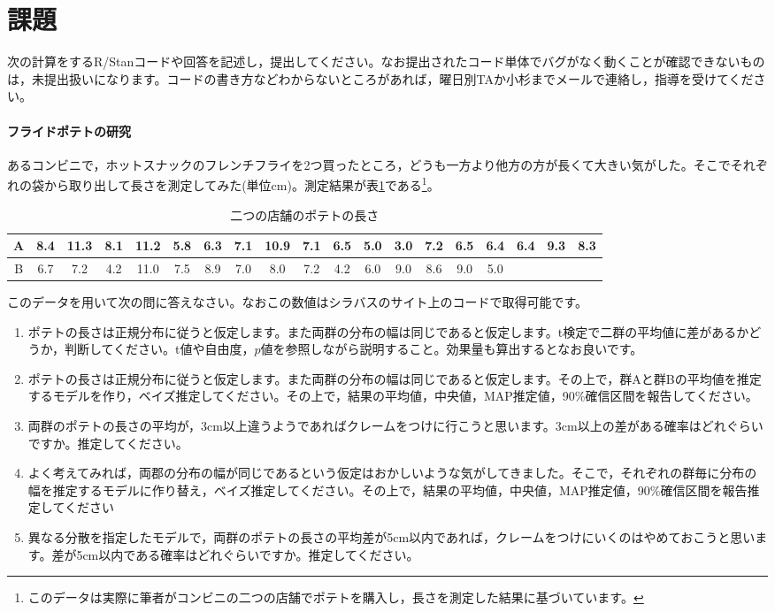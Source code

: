 \documentclass{ltjsbook}
\begin{document}
\section{課題}
次の計算をするR/Stanコードや回答を記述し，提出してください。なお提出されたコード単体でバグがなく動くことが確認できないものは，未提出扱いになります。コードの書き方などわからないところがあれば，曜日別TAか小杉までメールで連絡し，指導を受けてください。

\paragraph{フライドポテトの研究}
あるコンビニで，ホットスナックのフレンチフライを2つ買ったところ，どうも一方より他方の方が長くて大きい気がした。そこでそれぞれの袋から取り出して長さを測定してみた(単位cm)。測定結果が表\ref{tab:19_01}である\footnote{このデータは実際に筆者がコンビニの二つの店舗でポテトを購入し，長さを測定した結果に基づいています。}。
\begin{table}[ht]
	\center
	\caption{二つの店舗のポテトの長さ}
	\begin{tabular}{c|cccccccccccccccccc}\hline
		A & 8.4 & 11.3 & 8.1 & 11.2 & 5.8 & 6.3 & 7.1 & 10.9 & 7.1 & 6.5 & 5.0 & 3.0 & 7.2 & 6.5 & 6.4 & 6.4 & 9.3 & 8.3 \\\hline
		B & 6.7 & 7.2  & 4.2 & 11.0 & 7.5 & 8.9 & 7.0 & 8.0  & 7.2 & 4.2 & 6.0 & 9.0 & 8.6 & 9.0 & 5.0 &     &     &     \\\hline
	\end{tabular}
	\label{tab:19_01}
\end{table}
このデータを用いて次の問に答えなさい。なおこの数値はシラバスのサイト上のコードで取得可能です。
\begin{enumerate}
	\item ポテトの長さは正規分布に従うと仮定します。また両群の分布の幅は同じであると仮定します。t検定で二群の平均値に差があるかどうか，判断してください。t値や自由度，$p$値を参照しながら説明すること。効果量も算出するとなお良いです。
	\item ポテトの長さは正規分布に従うと仮定します。また両群の分布の幅は同じであると仮定します。その上で，群Aと群Bの平均値を推定するモデルを作り，ベイズ推定してください。その上で，結果の平均値，中央値，MAP推定値，90\%確信区間を報告してください。
	\item 両群のポテトの長さの平均が，3cm以上違うようであればクレームをつけに行こうと思います。3cm以上の差がある確率はどれぐらいですか。推定してください。
	\item よく考えてみれば，両郡の分布の幅が同じであるという仮定はおかしいような気がしてきました。そこで，それぞれの群毎に分布の幅を推定するモデルに作り替え，ベイズ推定してください。その上で，結果の平均値，中央値，MAP推定値，90\%確信区間を報告推定してください
	\item 異なる分散を指定したモデルで，両群のポテトの長さの平均差が5cm以内であれば，クレームをつけにいくのはやめておこうと思います。差が5cm以内である確率はどれぐらいですか。推定してください。
\end{enumerate}
\end{document}
